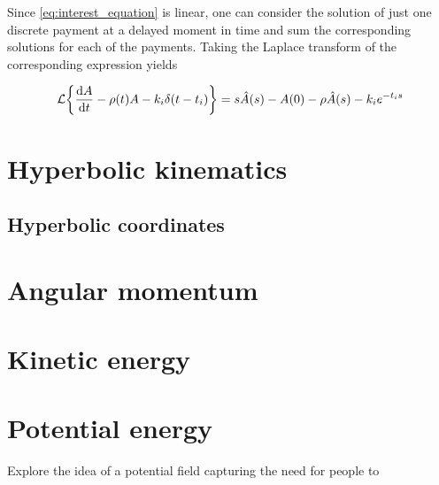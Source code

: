 Since \cref{eq:interest_equation} is linear, one can consider the solution of just one discrete payment at a delayed moment in time and sum the corresponding solutions for each of the payments. Taking the Laplace transform of the corresponding expression yields

\begin{equation}
    \mathcal{L} 
    \qty{\dv{\amnt}{t} - \hanv(t) \amnt - k_i \delta(t - t_i)} = s\hat{\amnt}(s) - A(0) - \hanv\hat{\amnt}(s) - k_i e^{-t_i s}
\end{equation}

\section{Hyperbolic kinematics}
\subsection{Hyperbolic coordinates}

\section{Angular momentum}

\section{Kinetic energy}

\section{Potential energy}
Explore the idea of a potential field capturing the need for people to
